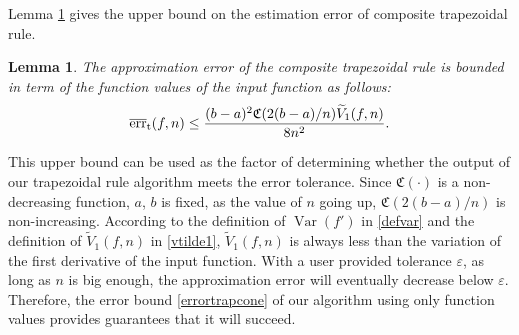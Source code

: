 \documentclass{iitthesis}
\DeclareMathOperator{\Var}{Var}
\newtheorem{lem}{Lemma}
\theoremstyle{definition}
\theoremstyle{remark}
\begin{document}
Lemma \ref{lemmaerrorboundtrap} gives the upper bound on the estimation error of composite trapezoidal rule.
\begin{lem}\label{lemmaerrorboundtrap}
    The approximation error of the composite trapezoidal rule is bounded in term of the function values of the input function as follows:
    \begin{equation}\label{errortrapcone}
      \overline{\textup{err}}_{\textup{t}}(f,n)\leq \frac{(b-a)^2\mathfrak{C}(2(b-a)/n)\widetilde{V}_1(f,n)}{8n^2}.
    \end{equation}
\end{lem}

This upper bound can be used as the factor of determining whether the output of our trapezoidal rule algorithm meets the error tolerance. Since $\mathfrak{C}(\cdot)$ is a non-decreasing function, $a$, $b$ is fixed, as the value of $n$ going up, $\mathfrak{C}(2(b-a)/n)$ is non-increasing. According to the definition of $\Var(f')$ in \eqref{defvar} and the definition of $\widetilde{V}_1(f,n)$ in \eqref{vtilde1}, $\widetilde{V}_1(f,n)$ is always less than the variation of the first derivative of the input function. With a user provided tolerance $\varepsilon$, as long as $n$ is big enough, the approximation error will eventually decrease below $\varepsilon$. Therefore, the error bound \eqref{errortrapcone} of our algorithm using only function values provides guarantees that it will succeed.

\end{document}
